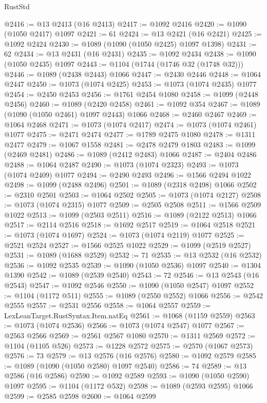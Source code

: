 \begin{lexlean}{RustStd}
\begin{coremodule}
{\begin{coremodule}
{{{{{{{{{{{{{{@2416 := @13 @2413 (@16 @2413)
@2417 := @1092 @2416
@2420 := @1090 (@1050 @2417) @1097
@2421 := 61
@2424 := @13 @2421 (@16 @2421)
@2425 := @1092 @2424
@2430 := @1089 (@1090 (@1050 @2425) @1097 @1398)
@2431 := 62
@2434 := @13 @2431 (@16 @2431)
@2435 := @1092 @2434
@2438 := @1090 (@1050 @2435) @1097
@2443 := @1104 (@1744 (@1746 @32 (@1748 @32)))
@2446 := @1089 (@2438 @2443) @1066
@2447 := @2430 @2446
@2448 := @1064 @2447
@2450 := @1073 (@1074 @2425)
@2453 := @1073 (@1074 @2435) @1077
@2454 := @2450 @2453
@2456 := @1761 @2454 @1080
@2458 := @1099 (@2448 @2456)
@2460 := @1089 (@2420 @2458)
@2461 := @1092 @354
@2467 := @1089 (@1090 (@1050 @2461) @1097 @2443) @1066
@2468 := @2460 @2467
@2469 := @1064 @2468
@2471 := @1073 (@1074 @2417)
@2474 := @1073 (@1074 @2461) @1077
@2475 := @2471 @2474
@2477 := @1789 @2475 @1080
@2478 := @1311 @2477
@2479 := @1067 @1558
@2481 := @2478 @2479 @1803
@2483 := @1099 (@2469 @2481)
@2486 := @1089 (@2412 @2483) @1066
@2487 := @2404 @2486
@2488 := @1064 @2487
@2490 := @1073 (@1074 @2323)
@2493 := @1073 (@1074 @2409) @1077
@2494 := @2490 @2493
@2496 := @1566 @2494 @1022
@2498 := @1099 (@2488 @2496)
@2501 := @1089 (@2318 @2498) @1066
@2502 := @2310 @2501
@2503 := @1064 @2502
@2505 := @1073 (@1074 @2127)
@2508 := @1073 (@1074 @2315) @1077
@2509 := @2505 @2508
@2511 := @1566 @2509 @1022
@2513 := @1099 (@2503 @2511)
@2516 := @1089 (@2122 @2513) @1066
@2517 := @2114 @2516
@2518 := @1692 @2517
@2519 := @1064 @2518
@2521 := @1073 (@1074 @1697)
@2524 := @1073 (@1074 @2119) @1077
@2525 := @2521 @2524
@2527 := @1566 @2525 @1022
@2529 := @1099 (@2519 @2527)
@2531 := @1089 (@1688 @2529)
@2532 := 71
@2535 := @13 @2532 (@16 @2532)
@2536 := @1092 @2535
@2539 := @1090 (@1050 @2536) @1097
@2540 := @1304 @1390
@2542 := @1089 (@2539 @2540)
@2543 := 72
@2546 := @13 @2543 (@16 @2543)
@2547 := @1092 @2546
@2550 := @1090 (@1050 @2547) @1097
@2552 := @1104 (@1172 @511)
@2555 := @1089 (@2550 @2552) @1066
@2556 := @2542 @2555
@2557 := @2531 @2556
@2558 := @1064 @2557
@2559 := LexLeanTarget.RustSyntax.Item.natEq
@2561 := @1068 (@1159 @2559)
@2563 := @1073 (@1074 @2536)
@2566 := @1073 (@1074 @2547) @1077
@2567 := @2563 @2566
@2569 := @2561 @2567 @1080
@2570 := @1311 @2569
@2572 := @1104 (@1105 @526)
@2573 := @1228 @2572
@2575 := @2570 (@1067 @2573)
@2576 := 73
@2579 := @13 @2576 (@16 @2576)
@2580 := @1092 @2579
@2585 := @1089 (@1090 (@1050 @2580) @1097 @2540)
@2586 := 74
@2589 := @13 @2586 (@16 @2586)
@2590 := @1092 @2589
@2593 := @1090 (@1050 @2590) @1097
@2595 := @1104 (@1172 @532)
@2598 := @1089 (@2593 @2595) @1066
@2599 := @2585 @2598
@2600 := @1064 @2599
}}}}}}}}}}}}}}
\end{coremodule}}
\end{coremodule}
\end{lexlean}
